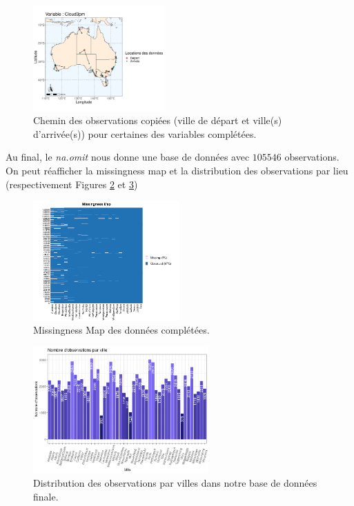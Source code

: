 \documentclass{article}
\begin{document}
\begin{figure}[ht]
    \includegraphics[width=0.45\textwidth]{Images/Australia_map_segments_complete/Australia_map_segments_complete-13.png}
    \caption{Chemin des observations copiées (ville de départ et ville(s) d'arrivée(s)) pour certaines des variables complétées.}
    \label{fig:path_data}
\end{figure}

Au final, le \emph{na.omit} nous donne une base de données avec $105546$ observations. On peut réafficher la missingness map et la distribution des observations par lieu (respectivement Figures \ref{fig:missingness_completed} et \ref{fig:distrib_completed})

\begin{figure}[ht]
    \centering
    \includegraphics[width=0.5\textwidth]{Images/missmap_completed.png}
    \caption{Missingness Map des données complétées.}
    \label{fig:missingness_completed}
\end{figure}

\begin{figure}[ht]
    \centering
    \includegraphics[width=0.6\textwidth]{Images/distribution_lieux_completed.png}
    \caption{Distribution des observations par villes dans notre base de données finale.}
    \label{fig:distrib_completed}
\end{figure}
\end{document}
